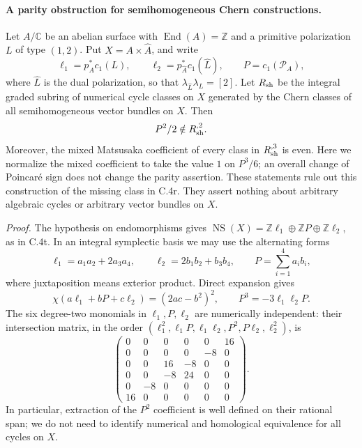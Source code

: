 \paragraph{A parity obstruction for semihomogeneous Chern constructions.}
Let $A/\mathbb C$ be an abelian surface with
$\operatorname{End}(A)=\mathbb Z$ and a primitive polarization $L$ of type
$(1,2)$. Put $X=A\times\widehat A$, and write
\[
 \ell_1=p_A^*c_1(L),\qquad
 \ell_2=p_{\widehat A}^*c_1(\widehat L),\qquad
 P=c_1(\mathcal P_A),
\]
where $\widehat L$ is the dual polarization, so that
$\lambda_{\widehat L}\lambda_L=[2]$. Let $R_{\rm sh}$ be the integral
graded subring of numerical cycle classes on $X$ generated by the Chern
classes of all semihomogeneous vector bundles on $X$. Then
\[
                    P^2/2\notin R_{\rm sh}^{,2}.
\]
Moreover, the mixed Matsusaka coefficient of every class in
$R_{\rm sh}^{,3}$ is even. Here we normalize the mixed coefficient to
take the value $1$ on $P^3/6$; an overall change of Poincar\'e sign does not
change the parity assertion. These statements rule out this construction
of the missing class in C.4r. They assert nothing about arbitrary algebraic
cycles or arbitrary vector bundles on $X$.

\emph{Proof.}
The hypothesis on endomorphisms gives
$\operatorname{NS}(X)=\mathbb Z\ell_1\oplus\mathbb ZP\oplus
\mathbb Z\ell_2$, as in C.4t. In an integral symplectic basis we may use
the alternating forms
\[
 \ell_1=a_1a_2+2a_3a_4,\qquad
 \ell_2=2b_1b_2+b_3b_4,\qquad
 P=\sum_{i=1}^4a_ib_i,
\]
where juxtaposition means exterior product. Direct expansion gives
\begin{equation}\label{eq:c4-sh-forms}
 \chi(a\ell_1+bP+c\ell_2)=(2ac-b^2)^2,
 \qquad P^3=-3\ell_1\ell_2P.
\end{equation}
The six degree-two monomials in $\ell_1,P,\ell_2$ are numerically
independent: their intersection matrix, in the order
$(\ell_1^2,\ell_1P,\ell_1\ell_2,P^2,P\ell_2,\ell_2^2)$, is
\[
 \begin{pmatrix}
 0&0&0&0&0&16\\
 0&0&0&0&-8&0\\
 0&0&16&-8&0&0\\
 0&0&-8&24&0&0\\
 0&-8&0&0&0&0\\
 16&0&0&0&0&0
 \end{pmatrix}.
\]
In particular, extraction of the $P^2$ coefficient is well defined on
their rational span; we do not need to identify numerical and
homological equivalence for all cycles on $X$.

